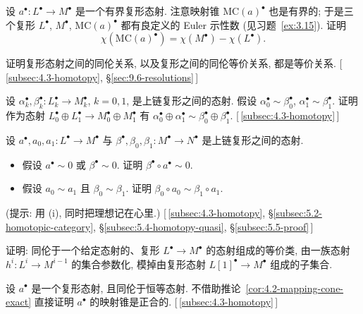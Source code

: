 \begin{prob}\label{ex:4.3}
设 $a^\bullet:L^\bullet\to M^\bullet$ 是一个有界复形态射. 注意映射锥 $\mathrm{MC}(a)^\bullet$ 也是有界的; 于是三个复形 $L^\bullet$, $M^\bullet$, $\mathrm{MC}(a)^\bullet$ 都有良定义的 Euler 示性数 (见习题~\ref{ex:3.15}). 证明
\[
\chi(\mathrm{MC}(a)^\bullet)=\chi(M^\bullet)-\chi(L^\bullet).
\]
\end{prob}

\begin{prob}\label{ex:4.4}
证明复形态射之间的同伦关系, 以及复形之间的同伦等价关系, 都是等价关系. [\,\ref{subsec:4.3-homotopy}, \S\ref{sec:9.6-resolutions}\,]
\end{prob}

\begin{prob}\label{ex:4.5}
设 $\alpha_k^\bullet,\beta_k^\bullet:L_k^\bullet\to M_k^\bullet$, $k=0,1$, 是上链复形之间的态射. 假设 $\alpha_0^\bullet\sim\beta_0^\bullet$, $\alpha_1^\bullet\sim\beta_1^\bullet$. 证明作为态射 $L_0^\bullet\oplus L_1^\bullet\to M_0^\bullet\oplus M_1^\bullet$ 有 $\alpha_0^\bullet\oplus\alpha_1^\bullet\sim\beta_0^\bullet\oplus\beta_1^\bullet$. [\,\ref{subsec:4.3-homotopy}\,]
\end{prob}

\begin{prob}\label{ex:4.6}
设 $a^\bullet,a_0,a_1:L^\bullet\to M^\bullet$ 与 $\beta^\bullet,\beta_0,\beta_1:M^\bullet\to N^\bullet$ 是上链复形之间的态射.
\begin{itemize}
\item[(i)] 假设 $a^\bullet\sim 0$ 或 $\beta^\bullet\sim 0$. 证明 $\beta^\bullet\circ a^\bullet\sim 0$.
\item[(ii)] 假设 $a_0\sim a_1$ 且 $\beta_0\sim\beta_1$. 证明 $\beta_0\circ a_0\sim\beta_1\circ a_1$.
\end{itemize}
(提示: 用 (i), 同时把理想记在心里.) [\,\ref{subsec:4.3-homotopy}, \S\ref{subsec:5.2-homotopic-category}, \S\ref{subsec:5.4-homotopy-quasi}, \S\ref{subsec:5.5-proof}\,]
\end{prob}

\begin{prob}\label{ex:4.7}
证明: 同伦于一个给定态射的、复形 $L^\bullet\to M^\bullet$ 的态射组成的等价类, 由一族态射 $h^i:L^i\to M^{i-1}$ 的集合参数化, 模掉由复形态射 $L[1]^\bullet\to M^\bullet$ 组成的子集合.
\end{prob}

\begin{prob}\label{ex:4.8}
设 $a^\bullet$ 是一个复形态射, 且同伦于恒等态射. 不借助推论~\ref{cor:4.2-mapping-cone-exact} 直接证明 $a^\bullet$ 的映射锥是正合的. [\,\ref{subsec:4.3-homotopy}\,]
\end{prob}


